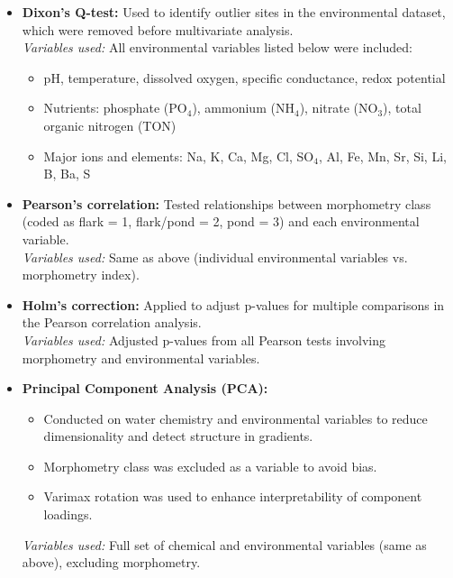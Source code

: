 \begin{itemize}
  \item \textbf{Dixon’s Q-test:} Used to identify outlier sites in the environmental dataset, which were removed before multivariate analysis.\\
  \textit{Variables used:} All environmental variables listed below were included:
  \begin{itemize}
    \item pH, temperature, dissolved oxygen, specific conductance, redox potential
    \item Nutrients: phosphate (PO$_4$), ammonium (NH$_4$), nitrate (NO$_3$), total organic nitrogen (TON)
    \item Major ions and elements: Na, K, Ca, Mg, Cl, SO$_4$, Al, Fe, Mn, Sr, Si, Li, B, Ba, S
  \end{itemize}

  \item \textbf{Pearson’s correlation:} Tested relationships between morphometry class (coded as flark = 1, flark/pond = 2, pond = 3) and each environmental variable.\\
  \textit{Variables used:} Same as above (individual environmental variables vs. morphometry index).

  \item \textbf{Holm’s correction:} Applied to adjust p-values for multiple comparisons in the Pearson correlation analysis.\\
  \textit{Variables used:} Adjusted p-values from all Pearson tests involving morphometry and environmental variables.

  \item \textbf{Principal Component Analysis (PCA):}
  \begin{itemize}
    \item Conducted on water chemistry and environmental variables to reduce dimensionality and detect structure in gradients.
    \item Morphometry class was excluded as a variable to avoid bias.
    \item Varimax rotation was used to enhance interpretability of component loadings.
  \end{itemize}
  \textit{Variables used:} Full set of chemical and environmental variables (same as above), excluding morphometry.
\end{itemize}

